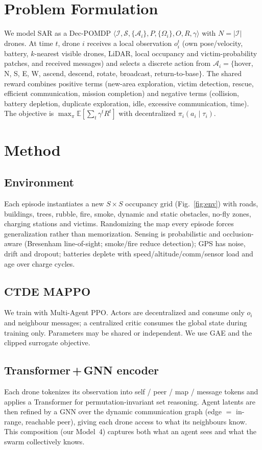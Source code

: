 \documentclass[twocolumn,10pt]{article}
\begin{document}
\section{Problem Formulation}
We model SAR as a Dec-POMDP $\langle \mathcal{I}, \mathcal{S}, \{\mathcal{A}_i\},
P, \{\Omega_i\}, O, R, \gamma\rangle$ with $N=|\mathcal{I}|$ drones. At time $t$,
drone $i$ receives a local observation $o_i^t$ (own pose/velocity, battery,
$k$-nearest visible drones, LiDAR, local occupancy and victim-probability patches,
and received messages) and selects a discrete action from
$\mathcal{A}_i=\{$hover, N, S, E, W, ascend, descend, rotate, broadcast,
return-to-base$\}$. The shared reward combines positive terms (new-area
exploration, victim detection, rescue, efficient communication, mission
completion) and negative terms (collision, battery depletion, duplicate
exploration, idle, excessive communication, time). The objective is
$\max_{\pi} \mathbb{E}\!\left[\sum_t \gamma^t R^t\right]$ with decentralized
$\pi_i(a_i\mid \tau_i)$.

\section{Method}
\subsection{Environment}
Each episode instantiates a new $S\times S$ occupancy grid (Fig.~\ref{fig:env})
with roads, buildings, trees, rubble, fire, smoke, dynamic and static obstacles,
no-fly zones, charging stations and victims. Randomizing the map every episode
forces generalization rather than memorization. Sensing is probabilistic and
occlusion-aware (Bresenham line-of-sight; smoke/fire reduce detection); GPS has
noise, drift and dropout; batteries deplete with speed/altitude/comm/sensor load
and age over charge cycles.

\subsection{CTDE MAPPO}
We train with Multi-Agent PPO. Actors are decentralized and consume only $o_i$ and
neighbour messages; a centralized critic consumes the global state during training
only. Parameters may be shared or independent. We use GAE and the clipped
surrogate objective.

\subsection{Transformer\,+\,GNN encoder}
Each drone tokenizes its observation into self / peer / map / message tokens and
applies a Transformer for permutation-invariant set reasoning. Agent latents are
then refined by a GNN over the dynamic communication graph (edge $=$ in-range,
reachable peer), giving each drone access to what its neighbours know. This
composition (our Model~4) captures both what an agent sees and what the swarm
collectively knows.
\end{document}
